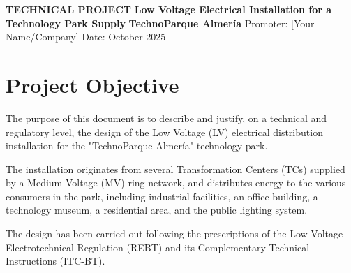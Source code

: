 \documentclass[12pt, a4paper]{report}
\begin{document}
\begin{titlepage}
    \centering
    \vspace*{2cm}
    {\Huge \textbf{TECHNICAL PROJECT}}
    \vspace{1.5cm}
    {\Large \textbf{Low Voltage Electrical Installation for a Technology Park Supply}}
    \vspace{2cm}
    {\Large \textbf{TechnoParque Almería}}
    \vspace{\fill}
    {\large Promoter: [Your Name/Company]}
    \vfill
    {\large Date: October 2025}
\end{titlepage}

\tableofcontents
\newpage

\chapter{Project Objective}
\label{chap:objeto}
The purpose of this document is to describe and justify, on a technical and regulatory level, the design of the Low Voltage (LV) electrical distribution installation for the "TechnoParque Almería" technology park.

The installation originates from several Transformation Centers (TCs) supplied by a Medium Voltage (MV) ring network, and distributes energy to the various consumers in the park, including industrial facilities, an office building, a technology museum, a residential area, and the public lighting system.

The design has been carried out following the prescriptions of the Low Voltage Electrotechnical Regulation (REBT) and its Complementary Technical Instructions (ITC-BT).
\end{document}
